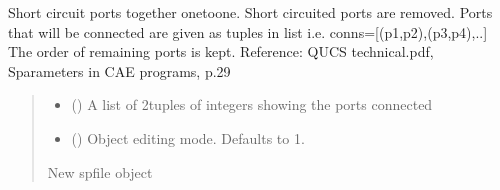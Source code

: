 \documentclass[letterpaper,10pt,english]{sphinxmanual}
\begin{document}
\begin{fulllineitems}
\begin{fulllineitems}
\begin{quote}
\begin{description}
\end{description}\end{quote}

\end{fulllineitems}


\begin{fulllineitems}
\label{\detokenize{touchstone:touchstone.spfile.connect_2_ports_list}}
\pysigstartsignatures
{}
\pysigstopsignatures
\sphinxAtStartPar
Short circuit ports together one\sphinxhyphen{}to\sphinxhyphen{}one. Short circuited ports are removed.
Ports that will be connected are given as tuples in list 
i.e. conns={[}(p1,p2),(p3,p4),..{]}
The order of remaining ports is kept.
Reference: QUCS technical.pdf, S\sphinxhyphen{}parameters in CAE programs, p.29
\begin{quote}\begin{description}
\begin{itemize}
\item {}
\sphinxAtStartPar
{} () \textendash{} A list of 2\sphinxhyphen{}tuples of integers showing the ports connected

\item {}
\sphinxAtStartPar
{} (\sphinxstyleliteralemphasis{\sphinxupquote{, }}) \textendash{} Object editing mode. Defaults to \sphinxhyphen{}1.

\end{itemize}

\sphinxAtStartPar
New spfile object

\sphinxAtStartPar
{\hyperref[\detokenize{touchstone:touchstone.spfile}]{}}

\end{description}\end{quote}

\end{fulllineitems}


\end{fulllineitems}
\end{document}

